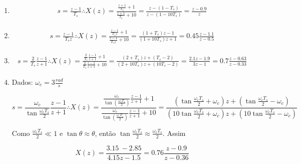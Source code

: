 \documentclass{article}
\begin{document}
\begin{enumerate}
\item %

\begin{equation}
\begin{split}
s = \frac{z - 1}{T_s} \therefore X(z) = \frac{\frac{z+1}{T_s} + 1}{\frac{z+1}{T_s} + 10} = \frac{z - (1-T_s)}{z - (1-10T_s)} = \frac{z - 0.9}{z} 
\end{split}
\end{equation}

\item %

\begin{equation}
\begin{split}
s = \frac{z - 1}{T_s z} \therefore X(z) = \frac{\frac{z-1}{T_s z} + 1}{\frac{z-1}{T_s z} + 10} = \frac{(1+T_s) z - 1}{(1 + 10T_s) z + 1} = 0.45 \frac{z - 1.1}{z - 0.5}
\end{split}
\end{equation}

\item %

\begin{equation}
\begin{split}
s = \frac{2}{T_s} \frac{z - 1}{z+1} \therefore X(z) = \frac{\frac{2}{T_s} \frac{z-1}{z+1} + 1}{\frac{2}{T_s} \frac{z-1}{z+1} + 10} = \frac{(2+T_s)z + (T_s - 2)}{(2 + 10T_s) z + (10 T_s - 2)} = \frac{2.1z - 1.9}{3z - 1} = 0.7\frac{z-0.63}{z-0.33}
\end{split}
\end{equation}

\item %
Dados: $\omega_c = 3 \frac{rad}{s}$

\begin{equation}
s = \frac{\omega_c}{\tan{\frac{\omega_c T_s}{2}}} \frac{z-1}{z+1} \therefore X(z) = \frac{\frac{\omega_c}{\tan(\frac{\omega_c T_s}{2})} \frac{z-1}{z+1} + 1}{\frac{\omega_c}{\tan(\frac{\omega_c T_s}{2})} \frac{z-1}{z+1} + 10} = \frac{(\tan{\frac{\omega_c T_s}{2}} + \omega_c) z + (\tan{\frac{\omega_c T_s}{2}} - \omega_c)}{(10 \tan{\frac{\omega_c T_s}{2}} + \omega_c) z + (10 \tan{\frac{\omega_c T_s}{2}} - \omega_c)} 
\end{equation}

Como $\frac{\omega_c T_s}{2} \ll 1$ e $\tan{\theta} \approx \theta$, então $\tan{\frac{\omega_c T_s}{2}} \approx \frac{\omega_c T_s}{2}$. Assim

\begin{equation}
X(z) = \frac{3.15\ - 2.85}{4.15z - 1.5} = 0.76 \frac{z - 0.9}{z - 0.36}
\end{equation}


\end{enumerate}
\end{document}
